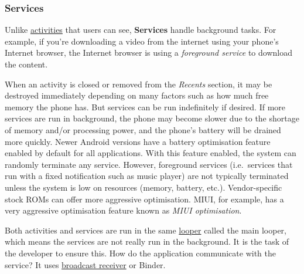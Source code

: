 \subsubsection{Services}\label{subsubsec:details:servcies} %
Unlike \hyperref[subsubsec:activities]{activities} that users can see, \textbf{Services} handle background tasks. For example,
if you're downloading a video from the internet using your phone's Internet browser, the Internet browser is using a
\textit{foreground service} to download the content.

When an activity is closed or removed from the \textit{Recents} section, it may be destroyed immediately depending on
many factors such as how much free memory the phone has. But services can be run indefinitely if desired. If more
services are run in background, the phone may become slower due to the shortage of memory and/or processing power, and
the phone's battery will be drained more quickly. Newer Android versions have a battery optimisation feature enabled
by default for all applications. With this feature enabled, the system can randomly terminate any service. However,
foreground services (i.e.\ services that run with a fixed notification such as music player) are not typically
terminated unless the system is low on resources (memory, battery, etc.). Vendor-specific stock ROMs can offer more
aggressive optimisation. MIUI, for example, has a very aggressive optimisation feature known as \textit{MIUI optimisation}.

Both activities and services are run in the same \href{https://stackoverflow.com/questions/7597742}{looper} called
the main looper, which means the services are not really run in the background. It is the task of the developer to
ensure this. How do the application communicate with the service? It uses
\hyperref[subsubsec:app-details-receivers]{broadcast receiver} or Binder.

